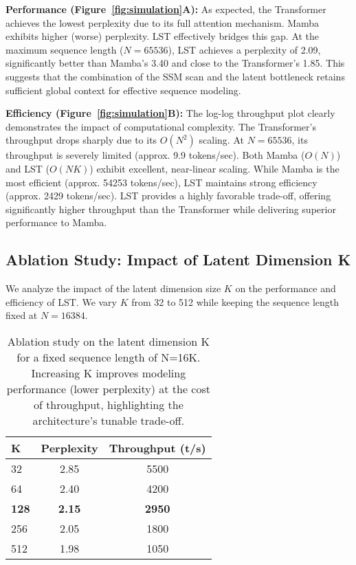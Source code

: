 \documentclass[10pt,twocolumn,letterpaper]{article}
\begin{document}
\begin{figure*}[t]
\centering
\caption{Trade-off between perplexity (lower is better) and throughput (tokens/s, log-log scale) as sequence length grows. LST approaches Transformer-level perplexity while maintaining high efficiency with near-linear scaling, providing a favorable trade-off compared to both baselines. (Note: This figure is illustrative; the generating code is not provided in this version.)}
\label{fig:simulation}
\end{figure*}

\textbf{Performance (Figure~\ref{fig:simulation}A):} As expected, the Transformer achieves the lowest perplexity due to its full attention mechanism. Mamba exhibits higher (worse) perplexity. LST effectively bridges this gap. At the maximum sequence length (\(N=65536\)), LST achieves a perplexity of 2.09, significantly better than Mamba's 3.40 and close to the Transformer's 1.85. This suggests that the combination of the SSM scan and the latent bottleneck retains sufficient global context for effective sequence modeling.

\textbf{Efficiency (Figure~\ref{fig:simulation}B):} The log-log throughput plot clearly demonstrates the impact of computational complexity. The Transformer's throughput drops sharply due to its \(O(N^{2})\) scaling. At \(N=65536\), its throughput is severely limited (approx. 9.9 tokens/sec). Both Mamba (\(O(N)\)) and LST (\(O(NK)\)) exhibit excellent, near-linear scaling. While Mamba is the most efficient (approx. 54253 tokens/sec), LST maintains strong efficiency (approx. 2429 tokens/sec). LST provides a highly favorable trade-off, offering significantly higher throughput than the Transformer while delivering superior performance to Mamba.

\subsection{Ablation Study: Impact of Latent Dimension K}

We analyze the impact of the latent dimension size \(K\) on the performance and efficiency of LST. We vary \(K\) from 32 to 512 while keeping the sequence length fixed at \(N=16384\).

\begin{table}[h]
\centering
\small
\begin{tabular}{@{}lcc@{}}
\toprule
\textbf{K} & \textbf{Perplexity} & \textbf{Throughput (t/s)} \\
\midrule
32 & 2.85 & 5500 \\
64 & 2.40 & 4200 \\
\textbf{128} & \textbf{2.15} & \textbf{2950} \\
256 & 2.05 & 1800 \\
512 & 1.98 & 1050 \\
\bottomrule
\end{tabular}
\caption{Ablation study on the latent dimension K for a fixed sequence length of N=16K. Increasing K improves modeling performance (lower perplexity) at the cost of throughput, highlighting the architecture's tunable trade-off.}
\label{tab:ablation_k}
\end{table}
\end{document}
